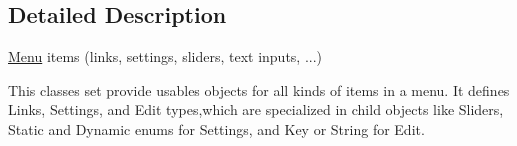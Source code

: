\subsection{Detailed Description}
\hyperlink{classMenu}{Menu} items (links, settings, sliders, text inputs, ...) 

This classes set provide usables objects for all kinds of items in a menu. It defines Links, Settings, and Edit types,which are specialized in child objects like Sliders, Static and Dynamic enums for Settings, and Key or String for Edit. 